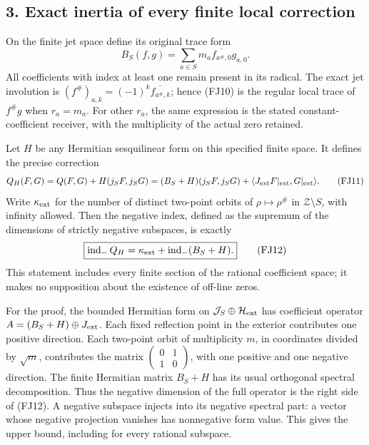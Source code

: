 \documentclass[
  10pt,
  a4paper,
]{article}
\begin{document}
\subsection{3. Exact inertia of every finite local
correction}\label{exact-inertia-of-every-finite-local-correction}

On the finite jet space define its original trace form \[
B_S(f,g)=\sum_{a\in S}m_a\overline{f_{a^\#,0}}g_{a,0}.
\tag{FJ10}
\] All coefficients with index at least one remain present in its
radical. The exact jet involution is
\((f^\#)_{a,k}=(-1)^k\overline{f_{a^\#,k}}\); hence (FJ10) is the
regular local trace of \(f^\#g\) when \(r_a=m_a\). For other \(r_a\),
the same expression is the stated constant-coefficient receiver, with
the multiplicity of the actual zero retained.

Let \(H\) be any Hermitian sesquilinear form on this specified finite
space. It defines the precise correction \[
Q_H(F,G)=Q(F,G)+H(j_SF,j_SG)
 =(B_S+H)(j_SF,j_SG)
   +\langle J_{\rm ext}F|_{\rm ext},G|_{\rm ext}\rangle.
\tag{FJ11}
\] Write \(\kappa_{\rm ext}\) for the number of distinct two-point
orbits of \(\rho\mapsto\rho^\#\) in \(\mathcal Z\setminus S\), with
infinity allowed. Then the negative index, defined as the supremum of
the dimensions of strictly negative subspaces, is exactly \[
\boxed{\operatorname{ind}_-Q_H=
 \kappa_{\rm ext}+\operatorname{ind}_-(B_S+H).}
\tag{FJ12}
\] This statement includes every finite section of the rational
coefficient space; it makes no supposition about the existence of
off-line zeros.

For the proof, the bounded Hermitian form on
\(\mathcal J_S\oplus\mathcal H_{\rm ext}\) has coefficient operator
\(A=(B_S+H)\oplus J_{\rm ext}\). Each fixed reflection point in the
exterior contributes one positive direction. Each two-point orbit of
multiplicity \(m\), in coordinates divided by \(\sqrt m\), contributes
the matrix
\(\left(\begin{smallmatrix}0&1\\1&0\end{smallmatrix}\right)\), with one
positive and one negative direction. The finite Hermitian matrix
\(B_S+H\) has its usual orthogonal spectral decomposition. Thus the
negative dimension of the full operator is the right side of (FJ12). A
negative subspace injects into its negative spectral part: a vector
whose negative projection vanishes has nonnegative form value. This
gives the upper bound, including for every rational subspace.
\end{document}
